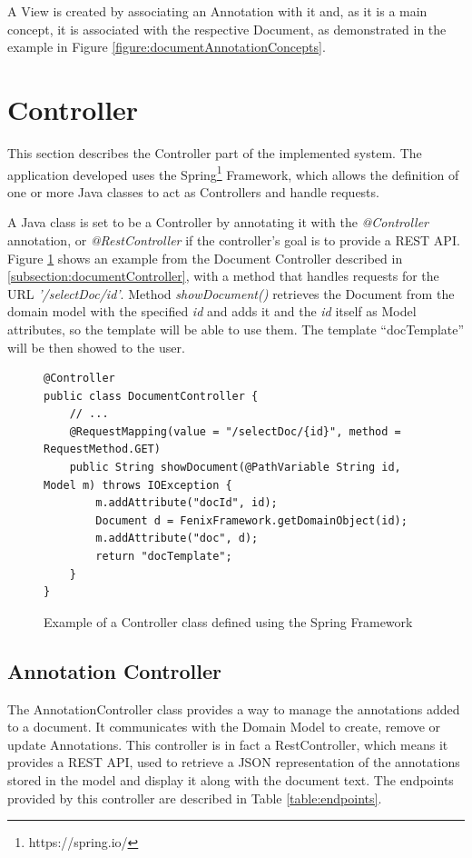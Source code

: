 A View is created by associating an Annotation with it and, as it is a main concept, it is associated with the respective Document, as demonstrated in the example in Figure \ref{figure:documentAnnotationConcepts}.

\section{Controller}

This section describes the Controller part of the implemented system. The application developed uses the Spring\footnote{https://spring.io/} Framework, which allows the definition of one or more Java classes to act as Controllers and handle requests.

A Java class is set to be a Controller by annotating it with the \textit{@Controller} annotation, or \textit{@RestController} if the controller's goal is to provide a REST API. Figure \ref{figure:springController} shows an example from the Document Controller described in \ref{subsection:documentController}, with a method that handles requests for the URL \textit{'/selectDoc/{id}'}. Method \textit{showDocument()} retrieves the Document from the domain model with the specified \textit{id} and adds it and the \textit{id} itself as Model attributes, so the template will be able to use them. The template ``docTemplate'' will be then showed to the user.

\begin{figure}[h]
\lstset{style=customjava}
\begin{lstlisting}
@Controller
public class DocumentController {
	// ...
	@RequestMapping(value = "/selectDoc/{id}", method = RequestMethod.GET)
	public String showDocument(@PathVariable String id, Model m) throws IOException {
		m.addAttribute("docId", id);
		Document d = FenixFramework.getDomainObject(id);
		m.addAttribute("doc", d);
		return "docTemplate";
	}
}	
\end{lstlisting}
\caption{Example of a Controller class defined using the Spring Framework} 
\label{figure:springController}
\end{figure}

\subsection{Annotation Controller}
The AnnotationController class provides a way to manage the annotations added to a document. It communicates with the Domain Model to create, remove or update Annotations. This controller is in fact a RestController, which means it provides a REST API, used to retrieve a JSON representation of the annotations stored in the model and display it along with the document text. 
The endpoints provided by this controller are described in Table \ref{table:endpoints}.
	
